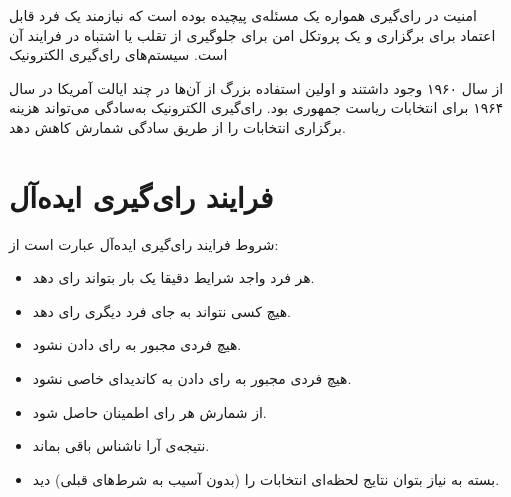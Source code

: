 \par
امنیت در رای‌گیری همواره یک مسئله‌ی پیچیده بوده است که نیازمند یک فرد قابل اعتماد برای برگزاری و یک پروتکل امن برای جلوگیری از تقلب یا اشتباه در فرایند آن است. سیستم‌های رای‌گیری الکترونیک 

از سال ۱۹۶۰ وجود داشتند و اولین استفاده‌ بزرگ از آن‌ها در چند ایالت آمریکا در سال ۱۹۶۴ برای انتخابات ریاست جمهوری بود. رای‌گیری الکترونیک به‌سادگی می‌تواند هزینه برگزاری انتخابات را از طریق سادگی شمارش کاهش دهد. 

\section{فرایند رای‌گیری ایده‌آل}

شروط فرایند رای‌گیری ایده‌آل عبارت‌ است از:
\begin{itemize}
	\item 
	هر فرد واجد شرایط دقیقا یک بار بتواند رای دهد.
	\item 
	هیچ کسی نتواند به جای فرد دیگری رای دهد.
	\item 
  	هیچ فردی مجبور به رای دادن نشود.
  	\item 
  	هیچ فردی مجبور به رای دادن به کاندیدای خاصی نشود.
  	\item 
  	از شمارش هر رای اطمینان حاصل شود.
  	\item 
    نتیجه‌ی آرا ناشناس  باقی بماند. 
  	\item 
  	بسته به نیاز بتوان نتایج لحظه‌ای انتخابات را (بدون آسیب به شرط‌های قبلی) دید.
\end{itemize}

